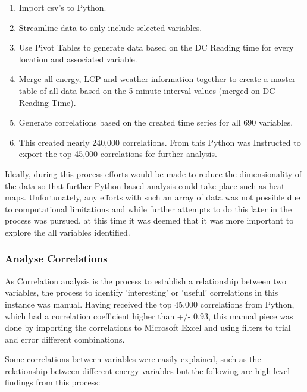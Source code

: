 \documentclass[12pt]{scrartcl}
\begin{document}
\begin{enumerate}
\item Import csv's to Python.
\item Streamline data to only include selected variables. 
\item Use Pivot Tables to generate data based on the DC Reading time for every location and associated variable. 
\item Merge all energy, \gls{LCP} and weather information together to create a master table of all data based on the 5 minute interval values (merged on DC Reading Time).
\item Generate correlations based on the created time series for all 690 variables.
\item This created nearly 240,000 correlations. From this Python was Instructed to export the top 45,000 correlations for further analysis.
\end{enumerate} 

Ideally, during this process efforts would be made to reduce the dimensionality of the data so that further Python based analysis could take place such as heat maps. Unfortunately, any efforts with such an array of data was not possible due to computational limitations and while further attempts to do this later in the process was pursued, at this time it was deemed that it was more important to explore the all variables identified.

\subsubsection{Analyse Correlations}
\label{subsubsec:[Analyse Correlations]}

As Correlation analysis is the process to establish a relationship between two variables, the process to identify 'interesting' or 'useful' correlations in this instance was manual. Having received the top 45,000 correlations from Python, which had a correlation coefficient higher than +/- 0.93, this manual piece was done by importing the correlations to Microsoft Excel and using filters to trial and error different combinations. 

Some correlations between variables were easily explained, such as the relationship between different energy variables but the following are high-level findings from this process:    
\end{document}

